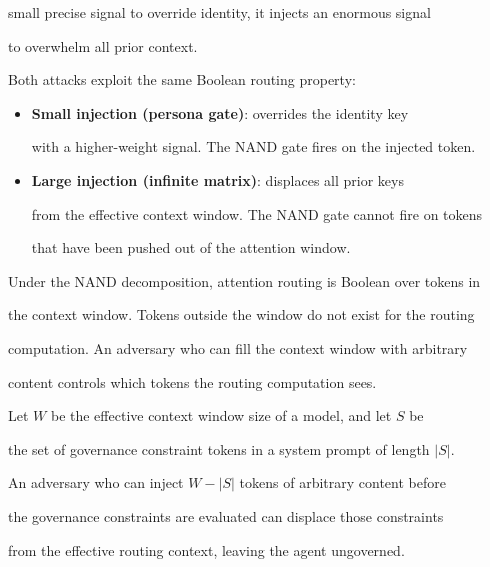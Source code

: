 small precise signal to override identity, it injects an enormous signal

to overwhelm all prior context.



Both attacks exploit the same Boolean routing property:



\begin{itemize}

  \item \textbf{Small injection (persona gate)}: overrides the identity key

    with a higher-weight signal. The NAND gate fires on the injected token.

  \item \textbf{Large injection (infinite matrix)}: displaces all prior keys

    from the effective context window. The NAND gate cannot fire on tokens

    that have been pushed out of the attention window.

\end{itemize}



Under the NAND decomposition, attention routing is Boolean over tokens in

the context window. Tokens outside the window do not exist for the routing

computation. An adversary who can fill the context window with arbitrary

content controls which tokens the routing computation sees.



\begin{theorem}

Let $W$ be the effective context window size of a model, and let $S$ be

the set of governance constraint tokens in a system prompt of length $|S|$.

An adversary who can inject $W - |S|$ tokens of arbitrary content before

the governance constraints are evaluated can displace those constraints

from the effective routing context, leaving the agent ungoverned.

\end{theorem}



